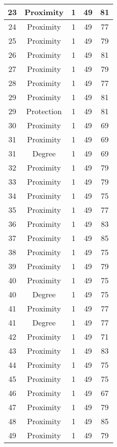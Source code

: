 \documentclass[results.tex]{subfiles}
\begin{document}
\begin{center}
\begin{tabular}{| c || c | c | c | c |}
    \hline
    23 & Proximity & 1 & 49 & 81 \\ 
    \hline
    24 & Proximity & 1 & 49 & 77 \\ 
    \hline
    25 & Proximity & 1 & 49 & 79 \\ 
    \hline
    26 & Proximity & 1 & 49 & 81 \\ 
    \hline
    27 & Proximity & 1 & 49 & 79 \\ 
    \hline
    28 & Proximity & 1 & 49 & 77 \\ 
    \hline
    29 & Proximity & 1 & 49 & 81 \\ 
    \hline
    29 & Protection & 1 & 49 & 81 \\ 
    \hline
    30 & Proximity & 1 & 49 & 69 \\ 
    \hline
    31 & Proximity & 1 & 49 & 69 \\ 
    \hline
    31 & Degree & 1 & 49 & 69 \\ 
    \hline
    32 & Proximity & 1 & 49 & 79 \\ 
    \hline
    33 & Proximity & 1 & 49 & 79 \\ 
    \hline
    34 & Proximity & 1 & 49 & 75 \\ 
    \hline
    35 & Proximity & 1 & 49 & 77 \\ 
    \hline
    36 & Proximity & 1 & 49 & 83 \\ 
    \hline
    37 & Proximity & 1 & 49 & 85 \\ 
    \hline
    38 & Proximity & 1 & 49 & 75 \\ 
    \hline
    39 & Proximity & 1 & 49 & 79 \\ 
    \hline
    40 & Proximity & 1 & 49 & 75 \\ 
    \hline
    40 & Degree & 1 & 49 & 75 \\ 
    \hline
    41 & Proximity & 1 & 49 & 77 \\ 
    \hline
    41 & Degree & 1 & 49 & 77 \\ 
    \hline
    42 & Proximity & 1 & 49 & 71 \\ 
    \hline
    43 & Proximity & 1 & 49 & 83 \\ 
    \hline
    44 & Proximity & 1 & 49 & 75 \\ 
    \hline
    45 & Proximity & 1 & 49 & 75 \\ 
    \hline
    46 & Proximity & 1 & 49 & 67 \\ 
    \hline
    47 & Proximity & 1 & 49 & 79 \\ 
    \hline
    48 & Proximity & 1 & 49 & 85 \\ 
    \hline
    49 & Proximity & 1 & 49 & 79 \\ 
    \hline   \end{tabular}
\end{center}
\end{document}

